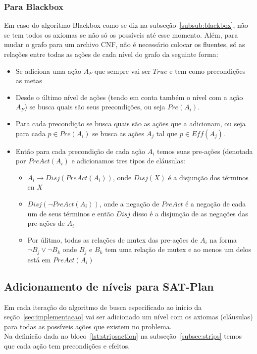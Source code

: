 	\subsubsection{Para Blackbox}
	\label{subsub:jsoncnfblackbox}
		Em caso do algoritmo Blackbox como se diz na subseção~\ref{subsub:blackbox}, não se tem todos os axiomas se não só os possíveis até esse momento. Além, para mudar o grafo para um archivo CNF, não é necessário colocar os fluentes, só as relações entre todas as ações de cada nível do grafo da seguinte forma:
		\begin{itemize}
			\item Se adiciona uma ação $A_F$ que sempre vai ser $True$ e tem como precondições as metas
			\item Desde o último nível de ações (tendo em conta também o nível com a ação $A_F$) se busca quais são seus precondições, ou seja ${Pre}( A_i )$.
			\item Para cada precondição se busca quais são as ações que a adicionam, ou seja para cada $p \in {Pre}( A_i )$ se busca as ações $A_j$ tal que $p \in {Eff}( A_j )$.
			\item Então para cada precondição de cada ação $A_i$ temos suas pre-ações (denotada por ${PreAct}( A_i )$ e adicionamos tres tipos de cláusulas:
				\begin{itemize}
					\item $A_i \to {Disj}( {PreAct}( A_i ) )$, onde ${Disj}( X )$ é a disjunção dos términos en $X$
					\item ${Disj}( \lnot {PreAct}( A_i ) )$, onde a negação de ${PreAct}$ é a negação de cada um de seus términos e então ${Disj}$ disso é a disjunção de as negações das pre-ações de $A_i$
					\item Por úlitmo, todas as relações de mutex das pre-ações de $A_i$ na forma $\lnot B_j \lor \lnot B_k$ onde $B_j$ e $B_k$ tem uma relação de mutex e ao menos um delos está em ${PreAct}( A_i )$
				\end{itemize}
		\end{itemize}
	
\subsection{Adicionamento de níveis para SAT-Plan}
\label{subsec:satplanaxioms}
	Em cada iteração do algoritmo de busca especificado ao inicio da seção~\ref{sec:implementacao} vai ser adicionado um nível com os axiomas (cláusulas) para todas as possíveis ações que existem no problema.\\
	Na definicão dada no bloco~\ref{lst:stripsaction} na subseção~\ref{subsec:strips} temos que cada ação tem precondições e efeitos.
